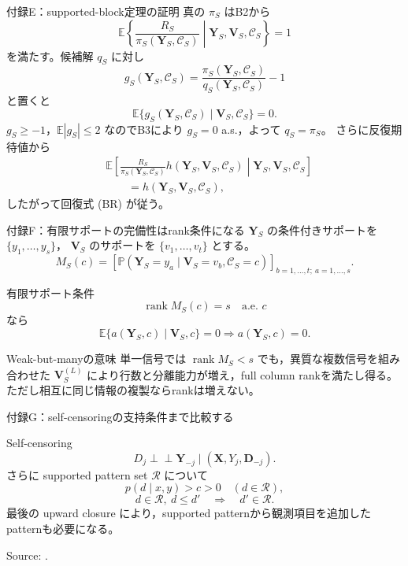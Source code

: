 \documentclass[aspectratio=169,10pt]{beamer}
\newcommand{\E}{\mathbb{E}}
\newcommand{\Prb}{\mathbb{P}}
\newcommand{\1}{\mathbf{1}}
\newcommand{\indep}{\mathrel{\perp\!\!\!\perp}}
\newcommand{\Y}{\bm{Y}}
\newcommand{\V}{\bm{V}}
\newcommand{\X}{\bm{X}}
\newcommand{\D}{\bm{D}}
\newcommand{\rank}{\operatorname{rank}}
\begin{document}
\begin{frame}[shrink=6]{付録E：supported-block定理の証明}
真の $\pi_S$ はB2から
\[
\E\left\{\frac{R_S}{\pi_S(\Y_S,\mathcal C_S)}
\middle|\Y_S,\V_S,\mathcal C_S\right\}=1
\]
を満たす。候補解 $q_S$ に対し
\[
g_S(\Y_S,\mathcal C_S)
=\frac{\pi_S(\Y_S,\mathcal C_S)}{q_S(\Y_S,\mathcal C_S)}-1
\]
と置くと
\[
\E\{g_S(\Y_S,\mathcal C_S)\mid\V_S,\mathcal C_S\}=0.
\]
$g_S\ge-1$，$\E|g_S|\le2$ なのでB3により $g_S=0$ a.s.，よって $q_S=\pi_S$。
さらに反復期待値から
\[
\begin{aligned}
&\E\left[
\frac{R_S}{\pi_S(\Y_S,\mathcal C_S)}h(\Y_S,\V_S,\mathcal C_S)
\middle|\Y_S,\V_S,\mathcal C_S
\right]\\
&\qquad=h(\Y_S,\V_S,\mathcal C_S),
\end{aligned}
\]
したがって回復式 (BR) が従う。
\end{frame}

\begin{frame}[shrink=7]{付録F：有限サポートの完備性はrank条件になる}
$\Y_S$ の条件付きサポートを $\{y_1,\ldots,y_s\}$，
$\V_S$ のサポートを $\{v_1,\ldots,v_t\}$ とする。
\[
M_S(c)=
\left[
\Prb(\Y_S=y_a\mid\V_S=v_b,\mathcal C_S=c)
\right]_{b=1,\ldots,t;\ a=1,\ldots,s}.
\]
\begin{block}{有限サポート条件}
\[
\rank M_S(c)=s\quad\text{a.e. }c
\]
なら
\[
\E\{a(\Y_S,c)\mid\V_S,c\}=0\Rightarrow a(\Y_S,c)=0.
\]
\end{block}
\begin{alertblock}{Weak-but-manyの意味}
単一信号では $\rank M_S<s$ でも，異質な複数信号を組み合わせた
$\V_S^{(L)}$ により行数と分離能力が増え，full column rankを満たし得る。
ただし相互に同じ情報の複製ならrankは増えない。
\end{alertblock}
\end{frame}

\begin{frame}{付録G：self-censoringの支持条件まで比較する}
\begin{block}{Self-censoring}
\scriptsize
\[
D_j\indep\Y_{-j}\mid(\X,Y_j,\D_{-j}).
\]
さらに supported pattern set $\mathcal R$ について
\[
p(d\mid x,y)>c>0\quad(d\in\mathcal R),
\]
\[
d\in\mathcal R,\ d\le d'\quad\Longrightarrow\quad d'\in\mathcal R.
\]
最後の upward closure により，supported patternから観測項目を追加したpatternも必要になる。
\end{block}
{\tiny Source: \textcite{LiMiaoShpitserTchetgen2023}.}
\end{frame}
\end{document}

